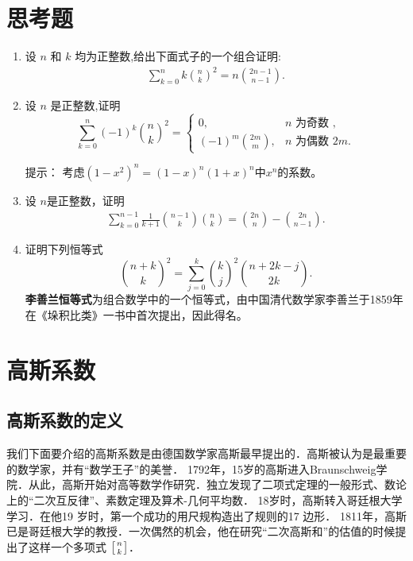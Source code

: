 \documentclass[a4paper,12pt]{ctexart}
\begin{document}
\section{思考题}

\begin{enumerate}
\item 设 $n$ 和 $k$ 均为正整数,给出下面式子的一个组合证明:
\begin{align*}
	\sum_{k=0}^{n} k \binom{n}{k}^{2}=n\binom{2n-1}{n-1}.
\end{align*}



\item
设 $n$ 是正整数,证明
$$
\sum_{k=0}^{n}(-1)^{k}\binom{n}{k}^{2}=\left\{\begin{array}{ll}
	0, & n \text { 为奇数 }, \\
	(-1)^{m}\binom{2m}{m}, & n \text { 为偶数 } 2 m .
\end{array}\right.
$$


提示： 考虑$(1-x^2)^n=(1-x)^n(1+x)^n$中$x^n$的系数。

\item
 设 $n$是正整数，证明
\begin{align*}
	\sum_{k=0}^{n-1}\frac{1}{k+1}\binom{n-1}{k}  \binom{n}{k}
=\binom{2n}{n}- \binom{2n}{n-1}.
\end{align*}



\item 证明下列恒等式
\begin{equation*}
	\binom{n+k}{k}^{2}=\sum_{j=0}^{k}\binom{k}{j}^{2}\binom{n+2k-j}{2k}.
\end{equation*}
\textbf{李善兰恒等式}为组合数学中的一个恒等式，由中国清代数学家李善兰于1859年在《垛积比类》一书中首次提出，因此得名。


\end{enumerate}




\section{高斯系数}
\subsection{高斯系数的定义}

我们下面要介绍的高斯系数是由德国数学家高斯最早提出的．高斯被认为是最重要的数学家，并有“数学王子”的美誉．
1792年，15岁的高斯进入Braunschweig学院．从此，高斯开始对高等数学作研究．独立发现了二项式定理的一般形式、数论上的“二次互反律”、素数定理及算术-几何平均数．
18岁时，高斯转入哥廷根大学学习．在他19 岁时，第一个成功的用尺规构造出了规则的17 边形．
1811年，高斯已是哥廷根大学的教授．一次偶然的机会，他在研究“二次高斯和”的估值的时候提出了这样一个多项式
$\left[{{n}\atop {k}}\right]$．
\end{document}
